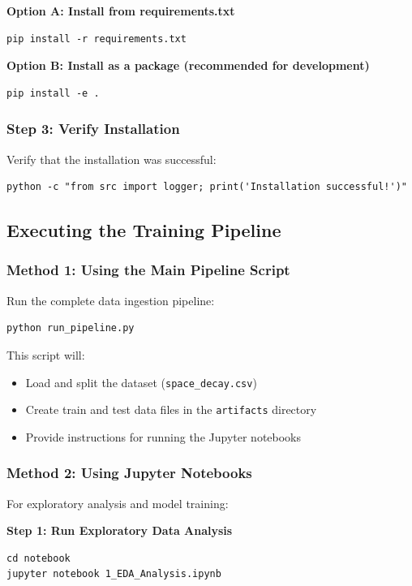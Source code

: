 \documentclass[12pt,a4paper]{article}
\begin{document}
\textbf{Option A: Install from requirements.txt}
\begin{verbatim}
pip install -r requirements.txt
\end{verbatim}

\textbf{Option B: Install as a package (recommended for development)}
\begin{verbatim}
pip install -e .
\end{verbatim}

\subsubsection{Step 3: Verify Installation}
Verify that the installation was successful:
\begin{verbatim}
python -c "from src import logger; print('Installation successful!')"
\end{verbatim}

\subsection{Executing the Training Pipeline}

\subsubsection{Method 1: Using the Main Pipeline Script}
Run the complete data ingestion pipeline:
\begin{verbatim}
python run_pipeline.py
\end{verbatim}

This script will:
\begin{itemize}
    \item Load and split the dataset (\texttt{space\_decay.csv})
    \item Create train and test data files in the \texttt{artifacts} directory
    \item Provide instructions for running the Jupyter notebooks
\end{itemize}

\subsubsection{Method 2: Using Jupyter Notebooks}
For exploratory analysis and model training:

\textbf{Step 1: Run Exploratory Data Analysis}
\begin{verbatim}
cd notebook
jupyter notebook 1_EDA_Analysis.ipynb
\end{verbatim}
\end{document}
